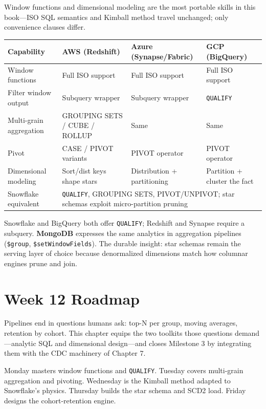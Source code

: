 \begin{crosscloud}
Window functions and dimensional modeling are the most portable skills in this book---ISO SQL semantics and Kimball method travel unchanged; only convenience clauses differ.

\vspace{2mm}
{\footnotesize
\begin{tabular}{@{}p{2.8cm}p{3.0cm}p{3.0cm}p{3.0cm}@{}}
\toprule
\textbf{Capability} & \textbf{AWS (Redshift)} & \textbf{Azure (Synapse/Fabric)} & \textbf{GCP (BigQuery)} \\
\midrule
Window functions & Full ISO support & Full ISO support & Full ISO support \\
Filter window output & Subquery wrapper & Subquery wrapper & \texttt{QUALIFY} \\
Multi-grain aggregation & GROUPING SETS / CUBE / ROLLUP & Same & Same \\
Pivot & CASE / PIVOT variants & PIVOT operator & PIVOT operator \\
Dimensional modeling & Sort/dist keys shape stars & Distribution + partitioning & Partition + cluster the fact \\
\addlinespace
Snowflake equivalent & \multicolumn{3}{l}{\texttt{QUALIFY}, GROUPING SETS, PIVOT/UNPIVOT; star schemas exploit micro-partition pruning} \\
\bottomrule
\end{tabular}}

\vspace{1mm}
Snowflake and BigQuery both offer \texttt{QUALIFY}; Redshift and Synapse require a subquery. \textbf{MongoDB} expresses the same analytics in aggregation pipelines (\texttt{\$group}, \texttt{\$setWindowFields}). The durable insight: star schemas remain the serving layer of choice because denormalized dimensions match how columnar engines prune and join.
\end{crosscloud}

\section{Week 12 Roadmap}
Pipelines end in questions humans ask: top-N per group, moving averages, retention by cohort. This chapter equips the two toolkits those questions demand---analytic SQL and dimensional design---and closes Milestone 3 by integrating them with the CDC machinery of Chapter 7.

Monday masters window functions and \texttt{QUALIFY}. Tuesday covers multi-grain aggregation and pivoting. Wednesday is the Kimball method adapted to Snowflake's physics. Thursday builds the star schema and SCD2 load. Friday designs the cohort-retention engine.

